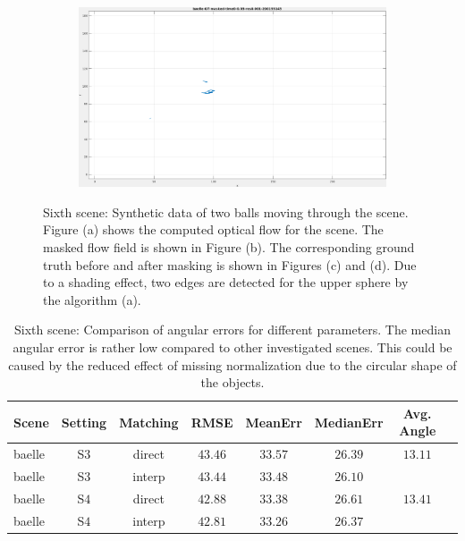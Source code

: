 \begin{figure}[tb]
\begin{subfigure}{.45\textwidth}
  \caption{}
\end{subfigure}
\begin{subfigure}{.45\textwidth}
  \centering
  \includegraphics[height=.6\linewidth]{figs/baelle/baelle-GT-masked-1.png}
  \caption{}
\end{subfigure}
\caption[Sixth scene: Synthetic data of two balls moving through the scene.]{Sixth scene: Synthetic data of two balls moving through the scene.
Figure (a) shows the computed optical flow for the scene. 
The masked flow field is shown in Figure (b).
The corresponding ground truth before and after masking is shown in Figures (c) and (d). 
Due to a shading effect, two edges are detected for the upper sphere by the algorithm (a).}
\label{fig:baelle-snapshots}
\end{figure}

\begin{table}[tb]
	\centering
		\begin{tabular}{lccccccc}
Scene & Setting & Matching & RMSE & MeanErr & MedianErr & Avg. Angle \\
\hline  \hline
baelle & S$3$ & direct & $43.46$ & $33.57$ & $26.39$ & $13.11$ & \\
baelle & S$3$ & interp & $43.44$ & $33.48$ & $26.10$ &  & \\
baelle & S$4$ & direct & $42.88$ & $33.38$ & $26.61$ & $13.41$ & \\
baelle & S$4$ & interp & $42.81$ & $33.26$ & $26.37$ &  & \\
		\end{tabular}
	\caption[Sixth scene: Comparison of angular errors for different parameters.]{Sixth scene: Comparison of angular errors for different parameters.
	The median angular error is rather low compared to other investigated scenes. 
	This could be caused by the reduced effect of missing normalization due to the circular shape of the objects.}
	\label{tab:error_comparison_baelle}
\end{table}


